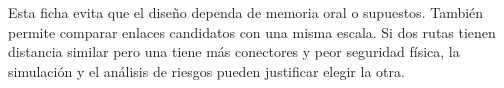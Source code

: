 Esta ficha evita que el diseño dependa de memoria oral o supuestos. También permite comparar enlaces candidatos con una misma escala. Si dos rutas tienen distancia similar pero una tiene más conectores y peor seguridad física, la simulación y el análisis de riesgos pueden justificar elegir la otra.
